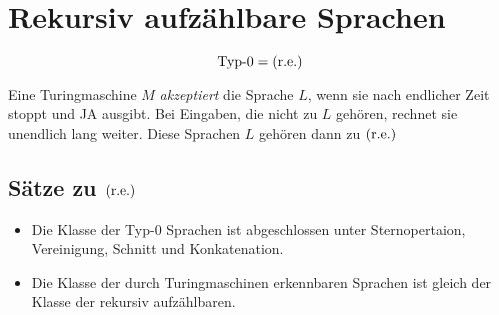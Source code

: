 \chapter{Rekursiv aufzählbare Sprachen}\label{sec:typ0}
\begin{equation*}
	\text{Typ-0} = \mathrm{(r.e.)}
\end{equation*}



Eine Turingmaschine $M$ \emph{akzeptiert} die Sprache $L$, wenn sie nach endlicher Zeit stoppt und JA ausgibt.
Bei Eingaben, die nicht zu $L$ gehören, rechnet sie unendlich lang weiter.
Diese Sprachen $L$ gehören dann zu $\mathrm{(r.e.)}$






\section{Sätze zu $\mathrm{(r.e.)}$}
\begin{itemize}
	\item Die Klasse der Typ-0 Sprachen ist abgeschlossen unter Sternopertaion, Vereinigung, Schnitt und Konkatenation.
	\item Die Klasse der durch Turingmaschinen erkennbaren Sprachen ist gleich der Klasse der rekursiv aufzählbaren.
\end{itemize}
